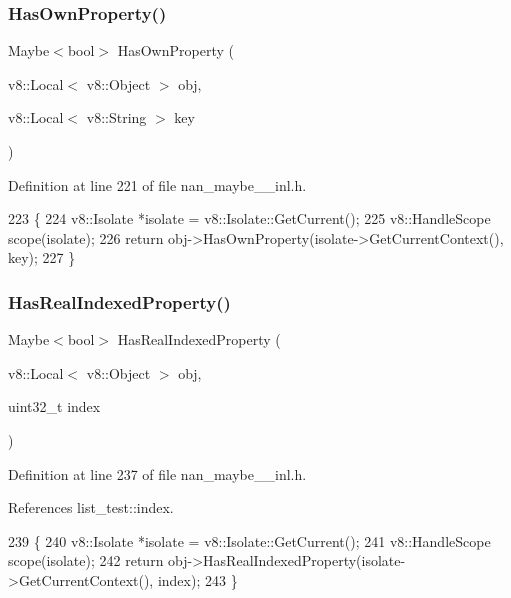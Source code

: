 \subsubsection{Has\+Own\+Property()}
{\footnotesize\ttfamily Maybe$<$bool$>$ Has\+Own\+Property (\begin{DoxyParamCaption}\item[{v8\+::\+Local$<$ v8\+::\+Object $>$}]{obj,  }\item[{v8\+::\+Local$<$ v8\+::\+String $>$}]{key }\end{DoxyParamCaption})}



Definition at line 221 of file nan\+\_\+maybe\+\_\+\_\+inl.\+h.


\begin{DoxyCode}
223                            \{
224   v8::Isolate *isolate = v8::Isolate::GetCurrent();
225   v8::HandleScope scope(isolate);
226   \textcolor{keywordflow}{return} obj->HasOwnProperty(isolate->GetCurrentContext(), key);
227 \}
\end{DoxyCode}
\mbox{\label{nan__maybe__43__inl_8h_a6c08f45e3992bbe05b89d484d70a1ce7}} 
\subsubsection{Has\+Real\+Indexed\+Property()}
{\footnotesize\ttfamily Maybe$<$bool$>$ Has\+Real\+Indexed\+Property (\begin{DoxyParamCaption}\item[{v8\+::\+Local$<$ v8\+::\+Object $>$}]{obj,  }\item[{uint32\+\_\+t}]{index }\end{DoxyParamCaption})}



Definition at line 237 of file nan\+\_\+maybe\+\_\+\_\+inl.\+h.



References list\+\_\+test\+::index.


\begin{DoxyCode}
239                     \{
240   v8::Isolate *isolate = v8::Isolate::GetCurrent();
241   v8::HandleScope scope(isolate);
242   \textcolor{keywordflow}{return} obj->HasRealIndexedProperty(isolate->GetCurrentContext(), index);
243 \}
\end{DoxyCode}
\mbox{\label{nan__maybe__43__inl_8h_a6cf6a23b7784019add0455ccf3e1c003}} 
